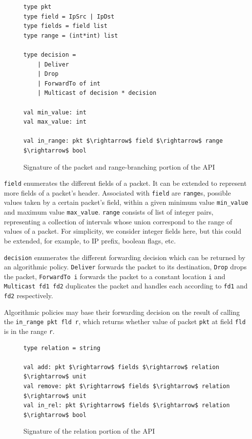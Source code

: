 \documentclass[preprint]{sigplanconf}
\begin{document}
\begin{figure}[ht]
  \begin{lstlisting}[mathescape]
type pkt
type field = IpSrc | IpDst 
type fields = field list
type range = (int*int) list

type decision =
	| Deliver
	| Drop
	| ForwardTo of int
	| Multicast of decision * decision

val min_value: int 
val max_value: int

val in_range: pkt $\rightarrow$ field $\rightarrow$ range $\rightarrow$ bool
\end{lstlisting}

\caption{Signature of the packet and range-branching portion of the API}
\label{fig:range_api}
\end{figure}


\lstinline|field| enumerates the different fields of a packet. It can be extended to represent more fields of a packet's header. Associated with \lstinline|field| are \lstinline|range|s, possible values taken by a certain packet's field, within a given minimum value \lstinline|min_value| and maximum value \lstinline|max_value|. \lstinline|range| consists of list of integer pairs, representing a collection of intervals whose union correspond to the range of values of a packet. For simplicity, we consider integer fields here, but this could be extended, for example, to IP prefix, boolean flags, etc.

\lstinline|decision| enumerates the different forwarding decision which can be returned by an algorithmic policy. \lstinline|Deliver| forwards the packet to its destination, \lstinline|Drop| drops the packet, \lstinline|ForwardTo i| forwards the packet to a constant location \lstinline|i| and \lstinline|Multicast fd1 fd2| duplicates the packet and handles each according to \lstinline|fd1| and \lstinline|fd2| respectively.

Algorithmic policies may base their forwarding decision on the result of calling the \lstinline|in_range pkt fld r|, which returns whether value of packet \lstinline|pkt| at field \lstinline|fld| is in the range \lstinline|r|.

\begin{figure}[ht]
  \begin{lstlisting}[mathescape]
type relation = string

val add: pkt $\rightarrow$ fields $\rightarrow$ relation $\rightarrow$ unit
val remove: pkt $\rightarrow$ fields $\rightarrow$ relation $\rightarrow$ unit
val in_rel: pkt $\rightarrow$ fields $\rightarrow$ relation $\rightarrow$ bool
\end{lstlisting}

\caption{Signature of the relation portion of the API}
\label{fig:rel_api}
\end{figure}
\end{document}
